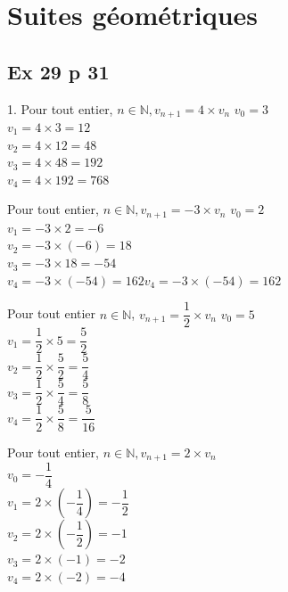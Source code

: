 \documentclass[a4paper,french]{book}
\begin{document}
\section*{Suites géométriques}

\subsection*{Ex 29 p 31}
\begin{enumMet}
    \item 1. Pour tout entier, $n \in \mathbb{N}, v_{n+1}=4 \times v_{n}$ $v_{0}=3$\\
    $v_{1}=4 \times 3=12$\\
    $v_{2}=4 \times 12=48$\\
    $v_{3}=4 \times 48=192$\\
    $v_{4}=4 \times 192=768$
    \item Pour tout entier, $n \in \mathbb{N}, v_{n+1}=-3 \times v_{n}$ $v_{0}=2$\\
    $v_{1}=-3 \times 2=-6$\\
    $v_{2}=-3 \times(-6)=18$\\
    $v_{3}=-3 \times 18=-54$\\
    $v_{4}=-3 \times(-54)=162 v_{4}=-3 \times(-54)=162$
    \item Pour tout entier $n \in \mathbb{N}$, $v_{n+1}=\dfrac{1}{2} \times v_{n}$ $v_{0}=5$\\
    $v_{1}=\dfrac{1}{2} \times 5=\dfrac{5}{2}$\\
    $v_{2}=\dfrac{1}{2} \times \dfrac{5}{2}=\dfrac{5}{4}$\\
    $v_{3}=\dfrac{1}{2} \times \dfrac{5}{4}=\dfrac{5}{8}$\\
    $v_{4}=\dfrac{1}{2} \times \dfrac{5}{8}=\dfrac{5}{16}$
    \item Pour tout entier, $n \in \mathbb{N}, v_{n+1}=2 \times v_{n}$\\
    $v_{0}=-\dfrac{1}{4}$\\
    $v_{1}=2 \times\left(-\dfrac{1}{4}\right)=-\dfrac{1}{2}$\\
    $v_{2}=2 \times\left(-\dfrac{1}{2}\right)=-1$\\
    $v_{3}=2 \times(-1)=-2$\\
    $v_{4}=2 \times(-2)=-4$
\end{enumMet}
\end{document}
